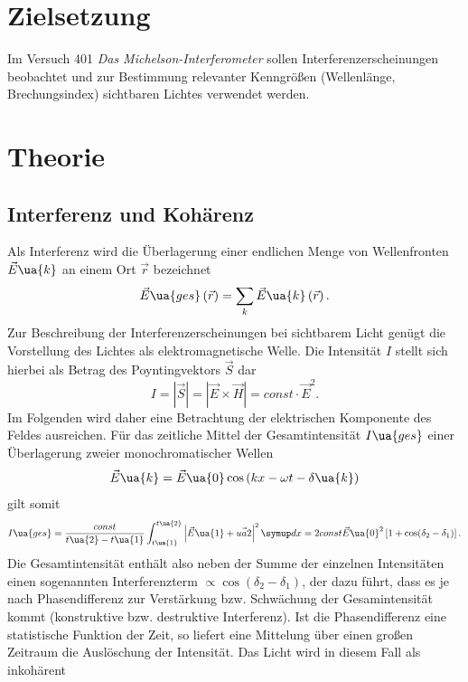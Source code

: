 \setcounter{page}{1}
\section*{Zielsetzung}
Im Versuch 401 \emph{Das Michelson-Interferometer} sollen Interferenzerscheinungen beobachtet und zur Bestimmung
relevanter Kenngrößen (Wellenlänge, Brechungsindex) sichtbaren Lichtes verwendet werden. %
\section{Theorie}
\subsection{Interferenz und Kohärenz}
Als Interferenz wird die Überlagerung einer endlichen Menge von Wellenfronten $\vec{E}\ua{k}$ an einem Ort $\vec{r}$ bezeichnet
\begin{equation}
  \vec{E}\ua{ges}\left(\vec{r}\right) = \sum_k \vec{E}\ua{k}\left(\vec{r}\right).
\end{equation}
Zur Beschreibung der Interferenzerscheinungen bei sichtbarem Licht genügt die Vorstellung des Lichtes als elektromagnetische
Welle. Die Intensität $I$ stellt sich hierbei als Betrag des Poyntingvektors $\vec{S}$ dar
\begin{equation}
  I = \left|\vec{S}\right| = \left| \vec{E} \times \vec{H}\right| = const \cdot \vec{E}^2.
\end{equation}
Im Folgenden wird daher eine Betrachtung der elektrischen Komponente des Feldes ausreichen.
Für das zeitliche Mittel der Gesamtintensität $I\ua{ges}$ einer Überlagerung zweier monochromatischer Wellen
\begin{equation}
  \vec{E}\ua{k} = \vec{E}\ua{0}\cos\left(kx - \omega t - \delta\ua{k} \right)
\end{equation}
gilt somit
\begin{equation}
  I\ua{ges} = \frac{const}{t\ua{2}- t\ua{1}}\int_{t\ua{1}}^{t\ua{2}}\left| \vec{E}\ua{1} + \vec{ua{2}} \right|^2 \dif{x} = 2const\vec{E}\ua{0}^2\left[1 + \cos(\delta_2- \delta_1)\right].
\end{equation}
Die Gesamtintensität enthält also neben der Summe der einzelnen Intensitäten einen sogenannten Interferenzterm $\propto \cos(\delta_2-\delta_1)$, der dazu führt, dass
es je nach Phasendifferenz zur Verstärkung bzw. Schwächung der Gesamintensität kommt (konstruktive bzw. destruktive Interferenz). Ist die Phasendifferenz eine
statistische Funktion der Zeit, so liefert eine Mittelung über einen großen Zeitraum die Auslöschung der Intensität. Das Licht wird in diesem Fall als inkohärent
